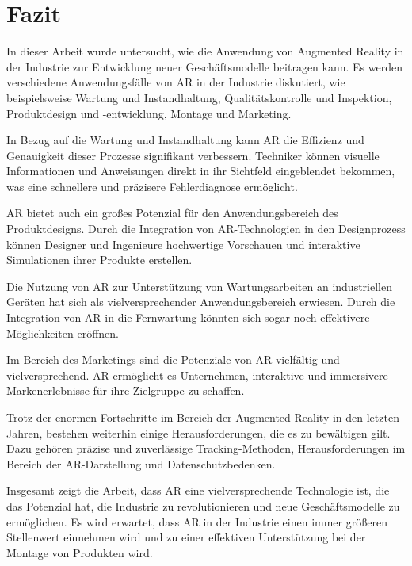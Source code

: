 \section{Fazit}

In dieser Arbeit wurde untersucht, wie die Anwendung von Augmented Reality
in der Industrie zur Entwicklung neuer Geschäftsmodelle beitragen kann. Es
werden verschiedene Anwendungsfälle von AR in der Industrie diskutiert, wie
beispielsweise Wartung und Instandhaltung, Qualitätskontrolle und Inspektion,
Produktdesign und -entwicklung, Montage und Marketing.

In Bezug auf die Wartung und Instandhaltung kann AR die Effizienz und
Genauigkeit dieser Prozesse signifikant verbessern. Techniker können visuelle
Informationen und Anweisungen direkt in ihr Sichtfeld eingeblendet bekommen,
was eine schnellere und präzisere Fehlerdiagnose ermöglicht.

AR bietet auch ein großes Potenzial für den Anwendungsbereich des
Produktdesigns. Durch die Integration von AR-Technologien in den Designprozess
können Designer und Ingenieure hochwertige Vorschauen und interaktive
Simulationen ihrer Produkte erstellen.

Die Nutzung von AR zur Unterstützung von Wartungsarbeiten an industriellen
Geräten hat sich als vielversprechender Anwendungsbereich erwiesen. Durch die
Integration von AR in die Fernwartung könnten sich sogar noch effektivere
Möglichkeiten eröffnen.

Im Bereich des Marketings sind die Potenziale von AR vielfältig und
vielversprechend. AR ermöglicht es Unternehmen, interaktive und immersivere
Markenerlebnisse für ihre Zielgruppe zu schaffen.

Trotz der enormen Fortschritte im Bereich der Augmented Reality in den letzten
Jahren, bestehen weiterhin einige Herausforderungen, die es zu bewältigen gilt.
Dazu gehören präzise und zuverlässige Tracking-Methoden, Herausforderungen im
Bereich der AR-Darstellung und Datenschutzbedenken.

Insgesamt zeigt die Arbeit, dass AR eine vielversprechende Technologie ist, die
das Potenzial hat, die Industrie zu revolutionieren und neue Geschäftsmodelle
zu ermöglichen. Es wird erwartet, dass AR in der Industrie einen immer größeren
Stellenwert einnehmen wird und zu einer effektiven Unterstützung bei der
Montage von Produkten wird.